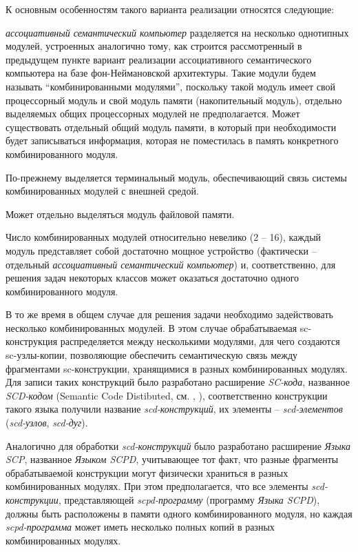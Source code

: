 К основным особенностям такого варианта реализации относятся следующие:
\begin{textitemize}
	\item \textit{ассоциативный семантический компьютер} разделяется на несколько однотипных модулей, устроенных аналогично тому, как строится рассмотренный в предыдущем пункте вариант реализации ассоциативного семантического компьютера на базе фон-Неймановской архитектуры. Такие модули будем называть ``комбинированными модулями'', поскольку такой модуль имеет свой процессорный модуль и свой модуль памяти (накопительный модуль), отдельно выделяемых общих процессорных модулей не предполагается. Может существовать отдельный общий модуль памяти, в который при необходимости будет записываться информация, которая не поместилась в память конкретного комбинированного модуля.
	\item По-прежнему выделяется терминальный модуль, обеспечивающий связь системы комбинированных модулей с внешней средой.
	\item Может отдельно выделяться модуль файловой памяти.
	\item Число комбинированных модулей относительно невелико (2 -- 16), каждый модуль представляет собой достаточно мощное устройство (фактически -- отдельный \textit{ассоциативный семантический компьютер}) и, соответственно, для решения задач некоторых классов может оказаться достаточно одного комбинированного модуля.
	\item В то же время в общем случае для решения задачи необходимо задействовать несколько комбинированных модулей. В этом случае обрабатываемая sc-конструкция распределяется между несколькими модулями, для чего создаются sc-узлы-копии, позволяющие обеспечить семантическую связь между фрагментами sc-конструкции, хранящимися в разных комбинированных модулях. Для записи таких конструкций было разработано расширение \textit{SC-кода}, названное \textit{SCD-кодом} (Semantic Code Distibuted, см. , ), соответственно конструкции такого языка получили название \textit{scd-конструкций}, их элементы -- \textit{scd-элементов} (\textit{scd-узлов}, \textit{scd-дуг}).
	\item Аналогично для обработки \textit{scd-конструкций} было разработано расширение \textit{Языка SCP}, названное \textit{Языком SCPD}, учитывающее тот факт, что разные фрагменты обрабатываемой конструкции могут физически храниться в разных комбинированных модулях. При этом предполагается, что все элементы \textit{scd-конструкции}, представляющей \textit{scpd-программу} (программу \textit{Языка SCPD}), должны быть расположены в памяти одного комбинированного модуля, но каждая \textit{scpd-программа} может иметь несколько полных копий в разных комбинированных модулях.

\end{textitemize}
